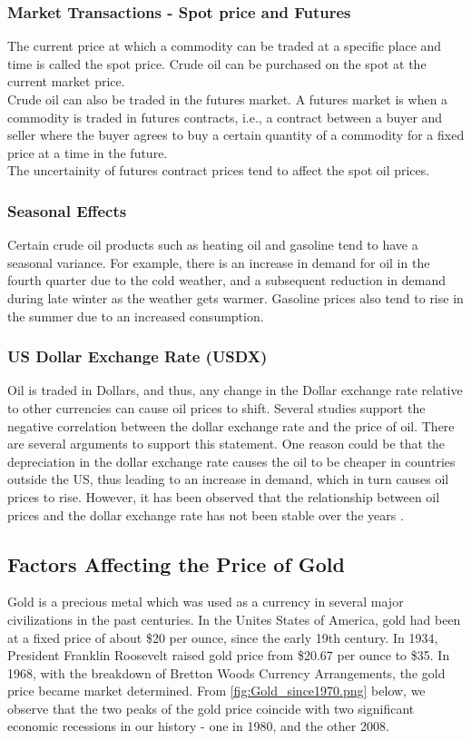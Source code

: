 \documentclass[runningheads]{llncs}
\begin{document}
\subsubsection{Market Transactions - Spot price and Futures}
The current price at which a commodity can be traded at a specific place and time is called the spot price. Crude oil can be purchased on the spot at the current market price. \\
Crude oil can also be traded in the futures market. A futures market is when a commodity is traded in futures contracts, i.e., a contract between a buyer and seller where the buyer agrees to buy a certain quantity of a commodity for a fixed price at a time in the future. \\
The uncertainity of futures contract prices tend to affect the spot oil prices.

\subsubsection{Seasonal Effects}
Certain crude oil products such as heating oil and gasoline tend to have a seasonal variance. For example, there is an increase in demand for oil in the fourth quarter due to the cold weather, and a subsequent reduction in demand during late winter as the weather gets warmer. Gasoline prices also tend to rise in the summer due to an increased consumption. 

\subsubsection{US Dollar Exchange Rate (USDX)}
Oil is traded in Dollars, and thus, any change in the Dollar exchange rate relative to other currencies can cause oil prices to shift. Several studies support the negative correlation between the  dollar exchange rate and the price of oil. There are several arguments to support this statement. One reason could be that the depreciation in the dollar exchange rate causes the oil to be cheaper in countries outside the US, thus leading to an increase in demand, which in turn causes oil prices to rise. However, it has been observed that the relationship between oil prices and the dollar exchange rate has not been stable over the years \cite{eiafactors} \cite{oildollar}.

\subsection{Factors Affecting the Price of Gold}
Gold is a precious metal which was used as a currency in several major civilizations in the past centuries. In the Unites States of America, gold had been at a fixed price of about \$20 per ounce, since the early 19th century. In 1934, President Franklin Roosevelt raised gold price from \$20.67 per ounce to \$35. In 1968, with the breakdown of Bretton Woods Currency Arrangements, the gold price became market determined. From \autoref{fig:Gold_since1970.png} below, we observe that the two peaks of the gold price coincide with two significant economic recessions in our history - one in 1980, and the other 2008.
\end{document}
